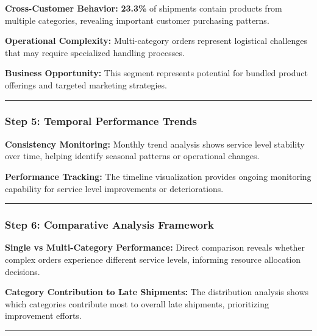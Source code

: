 \documentclass[
  letterpaper,
  DIV=11,
  numbers=noendperiod]{scrartcl}
\begin{document}
\textbf{Cross-Customer Behavior:} \textbf{23.3\%} of shipments contain
products from multiple categories, revealing important customer
purchasing patterns.

\textbf{Operational Complexity:} Multi-category orders represent
logistical challenges that may require specialized handling processes.

\textbf{Business Opportunity:} This segment represents potential for
bundled product offerings and targeted marketing strategies.

\begin{center}\rule{0.5\linewidth}{0.5pt}\end{center}

\subsubsection{\texorpdfstring{\textbf{Step 5: Temporal Performance
Trends}}{Step 5: Temporal Performance Trends}}\label{step-5-temporal-performance-trends}

\textbf{Consistency Monitoring:} Monthly trend analysis shows service
level stability over time, helping identify seasonal patterns or
operational changes.

\textbf{Performance Tracking:} The timeline visualization provides
ongoing monitoring capability for service level improvements or
deteriorations.

\begin{center}\rule{0.5\linewidth}{0.5pt}\end{center}

\subsubsection{\texorpdfstring{\textbf{Step 6: Comparative Analysis
Framework}}{Step 6: Comparative Analysis Framework}}\label{step-6-comparative-analysis-framework}

\textbf{Single vs Multi-Category Performance:} Direct comparison reveals
whether complex orders experience different service levels, informing
resource allocation decisions.

\textbf{Category Contribution to Late Shipments:} The distribution
analysis shows which categories contribute most to overall late
shipments, prioritizing improvement efforts.

\begin{center}\rule{0.5\linewidth}{0.5pt}\end{center}
\end{document}
